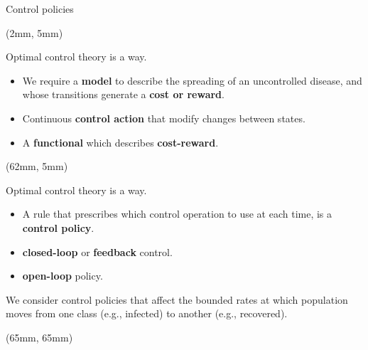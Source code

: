 {
\begin{frame}{Control policies}
    \begin{textblock*}{55mm}(2mm, 5mm)
        \begin{beamerboxesrounded}{Optimal control theory is a way.}
            \begin{itemize}
                \item
                    We require a \textbf{model} to describe the spreading of an 
                    uncontrolled disease, and whose transitions generate a 
                    \textbf{cost or reward}.
                \item
                    Continuous \textbf{control action} that modify changes 
                    between states.
                \item
                    A \textbf{functional} which describes \textbf{cost-reward}.
            \end{itemize}
        \end{beamerboxesrounded}
    \end{textblock*}
%
    \begin{textblock*}{65mm}(62mm, 5mm)
        \begin{beamerboxesrounded}{Optimal control theory is a way.}
            \begin{itemize}
                \item
                    A rule that prescribes which control
                    operation to use at each time, is a \textbf{control policy}.
                \item
                    \textbf{closed-loop} or \textbf{feedback} control.
                \item
                    \textbf{open-loop} policy.
            \end{itemize}
            We consider control policies that affect the bounded rates at which 
            population moves from one class (e.g., infected) to another (e.g., 
            recovered).
        \end{beamerboxesrounded}
    \end{textblock*}
    \begin{textblock*}{65mm}(65mm, 65mm)
        \begin{bibunit}[apalike]
            \nocite{Wickwire1977}
            \putbib
        \end{bibunit}
    \end{textblock*}
\end{frame}
}